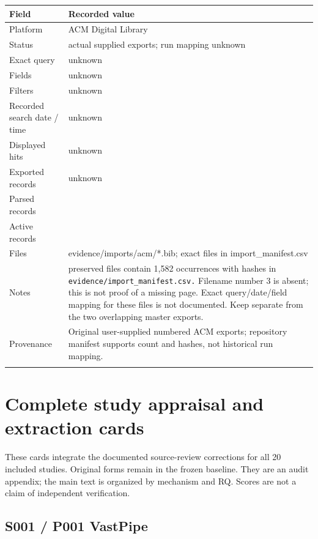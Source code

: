 \begin{longtable}{>{\raggedright\arraybackslash}p{}>{\raggedright\arraybackslash}p{}}
\toprule
\textbf{Field} & \textbf{Recorded value}\\\midrule\endhead
Platform & ACM Digital Library\\\addlinespace
Status & actual supplied exports; run mapping unknown\\\addlinespace
Exact query & unknown\\\addlinespace
Fields & unknown\\\addlinespace
Filters & unknown\\\addlinespace
Recorded search date / time & unknown\\\addlinespace
Displayed hits & unknown\\\addlinespace
Exported records & unknown\\\addlinespace
Parsed records & 1582\\\addlinespace
Active records & 1582\\\addlinespace
Files & evidence/imports/acm/*.bib; exact files in import\_manifest.csv\\\addlinespace
Notes & 79 preserved files contain 1,582 occurrences with hashes in \nolinkurl{evidence/import_manifest.csv.} Filename number 3 is absent; this is not proof of a missing page. Exact query/date/field mapping for these files is not documented. Keep separate from the two overlapping master exports.\\\addlinespace
Provenance & Original user-supplied numbered ACM exports; repository manifest supports count and hashes, not historical run mapping.\\\addlinespace
\bottomrule\end{longtable}

\section{Complete study appraisal and extraction cards}

These cards integrate the documented source-review corrections for all 20 included studies. Original forms remain in the frozen baseline. They are an audit appendix; the main text is organized by mechanism and RQ. Scores are not a claim of independent verification.

\clearpage\subsection{S001 / P001 VastPipe}

